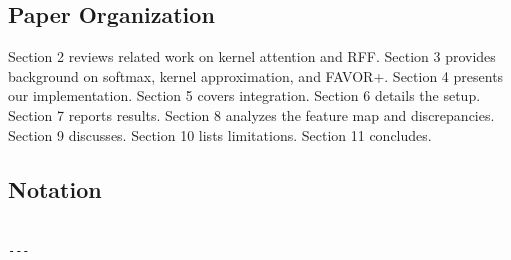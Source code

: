 \subsection{Paper Organization}

Section 2 reviews related work on kernel attention and RFF. Section 3 
provides background on softmax, kernel approximation, and FAVOR+. Section 4 
presents our implementation. Section 5 covers integration. Section 6 details 
the setup. Section 7 reports results. Section 8 analyzes the feature map 
and discrepancies. Section 9 discusses. Section 10 lists limitations. 
Section 11 concludes.



\subsection{Notation}

\begin{lstlisting}

---
\end{lstlisting}